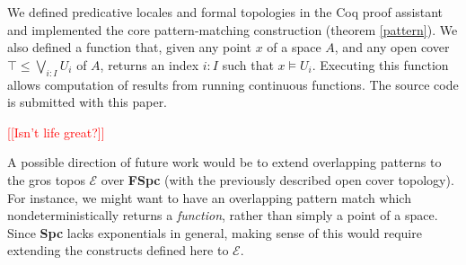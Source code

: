 \documentclass[conference]{IEEEtran}
\newcommand{\note}[1]{\textcolor{red}{[[{#1}]]}}
\begin{document}
We defined predicative locales and formal topologies in the Coq proof assistant and implemented the core pattern-matching construction (theorem \ref{pattern}). We also defined a function that, given any point $x$ of a space $A$, and any open cover $\top \le \bigvee_{i : I} U_i$ of $A$, returns an index $i : I$ such that $x \models U_i$. Executing this function allows computation of results from running continuous functions. The source code is submitted with this paper.


\note{Isn't life great?}

A possible direction of future work would be to extend overlapping patterns to the gros topos $\mathcal{E}$ over \textbf{FSpc} (with the previously described open cover topology). For instance, we might want to have an overlapping pattern match which nondeterministically returns a \emph{function}, rather than simply a point of a space. Since \textbf{Spc} lacks exponentials in general, making sense of this would require extending the constructs defined here to $\mathcal{E}$.











%
%
%






\end{document}
